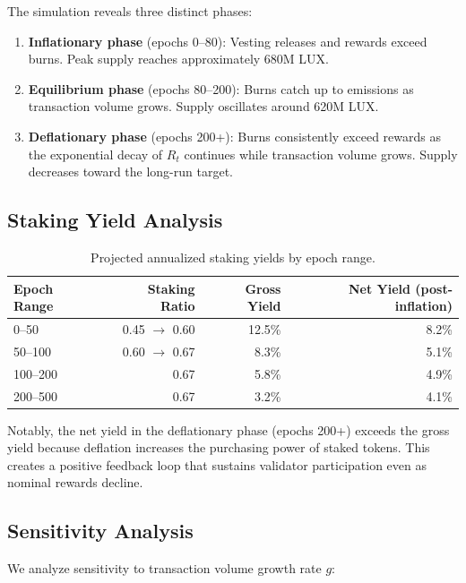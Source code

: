 \documentclass[11pt,a4paper]{article}
\begin{document}
The simulation reveals three distinct phases:
\begin{enumerate}
    \item \textbf{Inflationary phase} (epochs 0--80): Vesting releases and rewards exceed burns. Peak supply reaches approximately 680M LUX.
    \item \textbf{Equilibrium phase} (epochs 80--200): Burns catch up to emissions as transaction volume grows. Supply oscillates around 620M LUX.
    \item \textbf{Deflationary phase} (epochs 200+): Burns consistently exceed rewards as the exponential decay of $R_t$ continues while transaction volume grows. Supply decreases toward the long-run target.
\end{enumerate}

\subsection{Staking Yield Analysis}

\begin{table}[H]
\centering
\caption{Projected annualized staking yields by epoch range.}
\label{tab:yields}
\begin{tabular}{lrrr}
\toprule
\textbf{Epoch Range} & \textbf{Staking Ratio} & \textbf{Gross Yield} & \textbf{Net Yield (post-inflation)} \\
\midrule
0--50 & 0.45 $\to$ 0.60 & 12.5\% & 8.2\% \\
50--100 & 0.60 $\to$ 0.67 & 8.3\% & 5.1\% \\
100--200 & 0.67 & 5.8\% & 4.9\% \\
200--500 & 0.67 & 3.2\% & 4.1\% \\
\bottomrule
\end{tabular}
\end{table}

Notably, the net yield in the deflationary phase (epochs 200+) exceeds the gross yield because deflation increases the purchasing power of staked tokens. This creates a positive feedback loop that sustains validator participation even as nominal rewards decline.

\subsection{Sensitivity Analysis}

We analyze sensitivity to transaction volume growth rate $g$:
\end{document}
